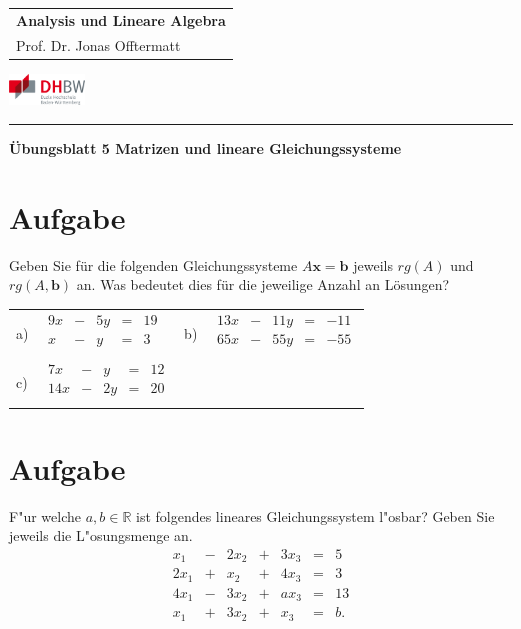 \documentclass[fontsize=11pt, parskip=half]{scrartcl}
\newcommand{\R}{\mathbb{R}}
\renewcommand{\vec}[1]{\boldsymbol #1}
\begin{document}
\noindent
\begin{tabular}{l}
    \textbf{Analysis und Lineare Algebra} \\    
    Prof. Dr. Jonas Offtermatt
\end{tabular}
\hfill \includegraphics[width=2cm]{DHBW.pdf}\\
\rule{\textwidth}{0.5pt}


\begin{center}
    \Large
    \textbf{Übungsblatt 5 Matrizen und lineare Gleichungssysteme}
\end{center}

\section{Aufgabe} Geben Sie für die folgenden Gleichungssysteme $A \vec{x}=\vec{b}$ jeweils $rg(A)$ und $rg(A,\vec{b})$ an. Was bedeutet dies für die jeweilige Anzahl an Lösungen? \\[0.2cm]
\begin{tabular}{llll}
a) & $\begin{array}{rcrcr}
    9x &- &5y &=&19 \\
     x &- &y  &=&3\\
    \end{array}$   &
b) & $\begin{array}{rcrcr}
    13x &- & 11y &=& -11 \\
    65x &- & 55y &=& -55\\
    \end{array}$   \\[0.8cm]
c) &  $\begin{array}{rcrcr}
    7x &- & y &=& 12 \\
    14x &- & 2y &=& 20\\
    \end{array}$ & &
\end{tabular}



\section{Aufgabe} F"ur welche $a,b \in \R$ ist folgendes lineares
Gleichungssystem l"osbar? Geben Sie jeweils die L"osungsmenge an.
\[\begin{array}{rcrcrcr}
 x_1 &- &2 x_2 &+ & 3x_3 &= &5 \\
2x_1 &+ &x_2 &+ &4x_3 &= &3 \\
4x_1 &- &3x_2 &+ &ax_3 &= &13 \\
x_1 &+ &3x_2 &+ & x_3  &= &b.  \end{array}
\]
\end{document}
